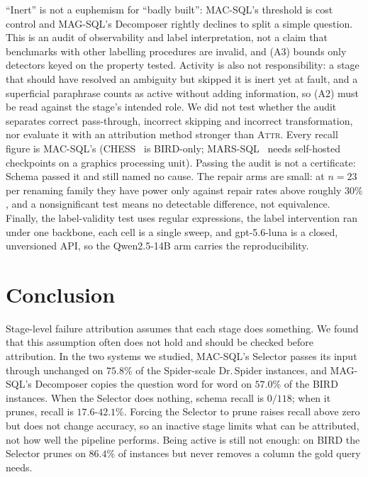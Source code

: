 \documentclass{llncs}
\begin{document}
``Inert'' is not a euphemism for ``badly built'': MAC-SQL's threshold is
cost control and MAG-SQL's Decomposer rightly declines to split a simple
question. This is an
audit of observability and label interpretation, not a claim that benchmarks
with other labelling procedures are invalid, and (A3) bounds only detectors
keyed on the property tested. Activity is also not responsibility: a stage
that should have resolved an ambiguity but skipped it is inert yet at fault,
and a superficial paraphrase counts as active without adding information, so
(A2) must be read against the stage's intended role. We did not test whether
the audit separates correct pass-through, incorrect skipping and incorrect
transformation, nor evaluate it with an attribution method stronger than
\textsc{Attr}. Every recall figure is MAC-SQL's
(CHESS~\cite{talaei_chess_2024} is BIRD-only;
MARS-SQL~\cite{yang_mars-sql_2025} needs self-hosted checkpoints on a graphics processing unit). Passing the audit is not a certificate: Schema passed it and still named
no cause. The repair arms are small: at $n = 23$ per renaming family they
have power only against repair rates above roughly $30\%$, and a
nonsignificant test means no detectable difference, not equivalence. Finally,
the label-validity test uses regular expressions, the label intervention ran under one
backbone, each cell is a single sweep, and gpt-5.6-luna is a closed,
unversioned API, so the Qwen2.5-14B arm carries the reproducibility.


\section{Conclusion}
\label{sec:conclusion}


Stage-level failure attribution assumes that each stage does something. We
found that this assumption often does not hold and should be checked before
attribution. In the two systems we studied, MAC-SQL's Selector passes its
input through unchanged on $75.8\%$ of the Spider-scale Dr.\,Spider
instances, and MAG-SQL's Decomposer copies the question word for word on
$57.0\%$ of the BIRD instances. When the Selector does nothing, schema recall
is $0/118$; when it prunes, recall is $17.6$-$42.1\%$. Forcing the Selector
to prune raises recall above zero but does not change accuracy, so an
inactive stage limits what can be attributed, not how well the pipeline
performs. Being active is still not enough: on BIRD the Selector prunes on
$86.4\%$ of instances but never removes a column the gold query needs.
\end{document}
